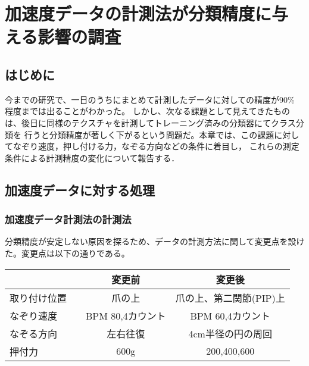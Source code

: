 ﻿\chapter{加速度データの計測法が分類精度に与える影響の調査}
\section{はじめに} 
今までの研究で、一日のうちにまとめて計測したデータに対しての精度が90\% 程度までは出ることがわかった。
しかし、次なる課題として見えてきたものは、後日に同様のテクスチャを計測してトレーニング済みの分類器にてクラス分類を
行うと分類精度が著しく下がるという問題だ。本章では、この課題に対してなぞり速度，押し付ける力，なぞる方向などの条件に着目し，
これらの測定条件による計測精度の変化について報告する．
\section{加速度データに対する処理}
\subsection{加速度データ計測法の計測法}
分類精度が安定しない原因を探るため、データの計測方法に関して変更点を設けた。変更点は以下の通りである。
\begin{table}[htb]
	\begin{tabular}{|l||c|c|}\hline
	　　　　  & 変更前　　& 変更後\\ \hline \hline
取り付け位置　&爪の上    & 爪の上、第二関節(PIP)上 \\ \hline
なぞり速度　　& BPM 80,4カウント   & BPM 60,4カウント \\ \hline
なぞる方向  　&左右往復　&4cm半径の円の周回\\ \hline
押付力      　&600g      &200,400,600 \\ \hline
	\end{tabular}
\end{table}
